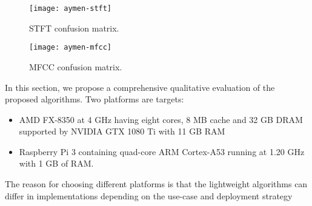 \begin{figure}%
    \centering
    \texttt{[image: aymen-stft]}
    \caption{STFT confusion matrix.}
    \label{aymen-stft}
\end{figure}

\begin{figure}%
    \centering
    \texttt{[image: aymen-mfcc]}
    \caption{MFCC confusion matrix.}
    \label{aymen-stft}
\end{figure}


In this section, we propose a comprehensive qualitative evaluation of the proposed algorithms. Two platforms are targets:
\begin{itemize}
\item AMD FX-8350 at 4 GHz having eight cores, 8 MB cache and 32 GB DRAM supported by NVIDIA GTX 1080 Ti with 11 GB RAM
\item Raspberry Pi 3 containing quad-core ARM Cortex-A53 running at 1.20 GHz with 1 GB of RAM.
\end{itemize}

\noindent The reason for choosing different platforms is that the lightweight algorithms can differ in implementations depending on the use-case and deployment strategy


